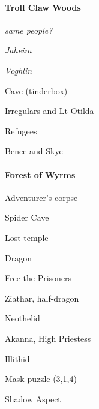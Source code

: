 \documentclass[10pt,a4,twoside]{book}
\begin{document}
\begin{multicols}{3}
\paragraph*{Troll Claw Woods}
\begin{trivlist}
\item \emph{same people?}
\item \emph{Jaheira}
\item \emph{Voghlin}
\item Cave (tinderbox)
\item Irregulars and Lt Otilda %
\item Refugees
\item Bence and Skye
\end{trivlist}

\paragraph*{Forest of Wyrms}
\begin{trivlist}
\item Adventurer's corpse
\item Spider Cave %
\item Lost temple
\item Dragon
\item Free the Prisoners
\item Ziathar, half-dragon
\item Neothelid
\item Akanna, High Priestess
\item Illithid
\item Mask puzzle (3,1,4)
\item Shadow Aspect
\end{trivlist}


\end{multicols}
\end{document}
